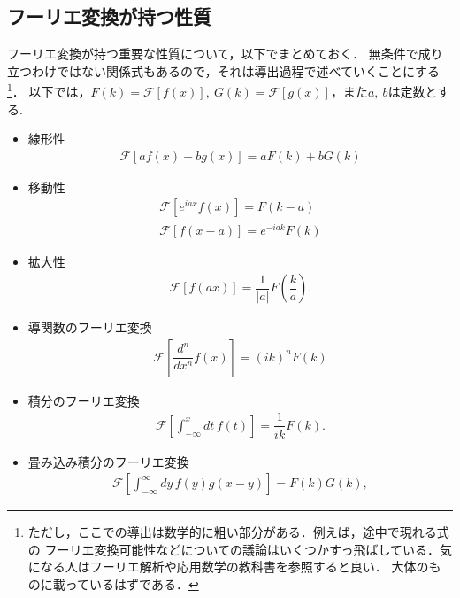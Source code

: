 \subsection{フーリエ変換が持つ性質}
%
フーリエ変換が持つ重要な性質について，以下でまとめておく．
無条件で成り立つわけではない関係式もあるので，それは導出過程で述べていくことにする
\footnote{ただし，ここでの導出は数学的に粗い部分がある．例えば，途中で現れる式の
フーリエ変換可能性などについての議論はいくつかすっ飛ばしている．気になる人はフーリエ解析や応用数学の教科書を参照すると良い．
大体のものに載っているはずである．}．
以下では，$F\left(k\right) = \mathcal{F}\left[f\left(x\right)\right],~G\left(k\right) = \mathcal{F}\left[g\left(x\right)\right]$，また$a,~b$は定数とする.
\begin{itemize}
  \item 線形性 
	\begin{align}
	  \mathcal{F}\left[af\left(x\right) + bg\left(x\right)\right] = aF\left(k\right) + bG\left(k\right)
	\end{align}

  \item 移動性
	\begin{align}
	  \mathcal{F}\left[e^{iax}f\left(x\right)\right] = F\left(k-a\right) \\
	  \mathcal{F}\left[f\left(x-a\right)\right]      = e^{-iak}F\left(k\right)
	\end{align}
  \item 拡大性
	\begin{align}
	  \mathcal{F}\left[f\left(ax\right)\right] = \dfrac{1}{\left|a\right|}F\left(\dfrac{k}{a}\right). 
	\end{align}
  \item 導関数のフーリエ変換 
	\begin{align}
	  \mathcal{F}\left[\dfrac{d^n}{dx^n}f\left(x\right)\right] = \left(ik\right)^{n} F\left(k\right)
	\end{align}
  \item 積分のフーリエ変換
	\begin{align}
	  \mathcal{F}\left[\int_{-\infty}^{x} dt\, f\left(t\right)\right] = \dfrac{1}{ik}F\left(k\right).
	\end{align}
  \item 畳み込み積分のフーリエ変換
	\begin{align}
	  \mathcal{F}\left[\int_{-\infty}^{\infty}dy\,f\left(y\right)g\left(x-y\right)\right] = F\left(k\right)G\left(k\right),
	\end{align}

\end{itemize}
%
